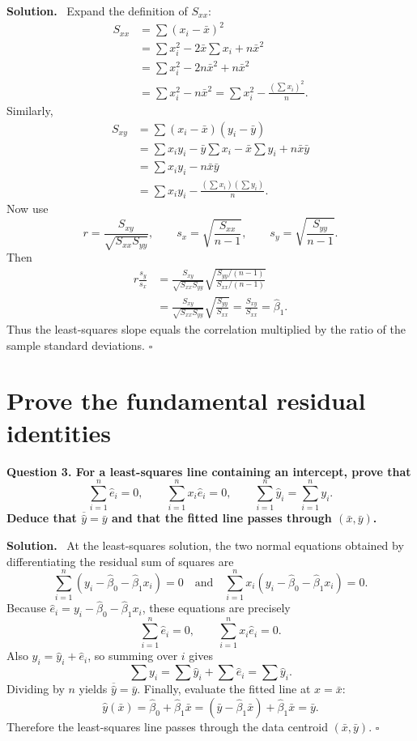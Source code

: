 \documentclass[11pt]{article}
\newcommand{\Sxx}{S_{xx}}
\newcommand{\Sxy}{S_{xy}}
\newcommand{\Syy}{S_{yy}}
\newcommand{\bzero}{\widehat{\beta}_0}
\newcommand{\bone}{\widehat{\beta}_1}
\newcommand{\yhat}{\widehat{y}}
\newcommand{\e}{\widehat{e}}
\newenvironment{question}
  {\par\medskip\noindent\color{navy}\bfseries}
  {\par\medskip\color{black}}
\newenvironment{solution}
  {\noindent\color{darkgreen}\textbf{Solution.}\color{black}\ }
  {\hfill$\square$\par\medskip}
\begin{document}
\begin{solution}
Expand the definition of $\Sxx$:
\begin{align*}
\Sxx
 &=\sum(x_i-\bar x)^2\\
 &=\sum x_i^2-2\bar x\sum x_i+n\bar x^2\\
 &=\sum x_i^2-2n\bar x^2+n\bar x^2\\
 &=\sum x_i^2-n\bar x^2
 =\sum x_i^2-\frac{(\sum x_i)^2}{n}.
\end{align*}
Similarly,
\begin{align*}
\Sxy
 &=\sum(x_i-\bar x)(y_i-\bar y)\\
 &=\sum x_iy_i-\bar y\sum x_i-\bar x\sum y_i+n\bar x\bar y\\
 &=\sum x_iy_i-n\bar x\bar y\\
 &=\sum x_iy_i-\frac{(\sum x_i)(\sum y_i)}{n}.
\end{align*}
Now use
\[
 r=\frac{\Sxy}{\sqrt{\Sxx\Syy}},
 \qquad
 s_x=\sqrt{\frac{\Sxx}{n-1}},
 \qquad
 s_y=\sqrt{\frac{\Syy}{n-1}}.
\]
Then
\begin{align*}
r\frac{s_y}{s_x}
 &=\frac{\Sxy}{\sqrt{\Sxx\Syy}}
   \sqrt{\frac{\Syy/(n-1)}{\Sxx/(n-1)}}\\
 &=\frac{\Sxy}{\sqrt{\Sxx\Syy}}
   \sqrt{\frac{\Syy}{\Sxx}}
 =\frac{\Sxy}{\Sxx}
 =\bone.
\end{align*}
Thus the least-squares slope equals the correlation multiplied by the ratio
of the sample standard deviations.
\end{solution}

\section{Prove the fundamental residual identities}

\begin{question}
Question 3. For a least-squares line containing an intercept, prove that
\[
 \boxed{\sum_{i=1}^n\e_i=0},
 \qquad
 \boxed{\sum_{i=1}^n x_i\e_i=0},
 \qquad
 \boxed{\sum_{i=1}^n\yhat_i=\sum_{i=1}^n y_i}.
\]
Deduce that $\overline{\widehat y}=\bar y$ and that the fitted line passes
through $(\bar x,\bar y)$.
\end{question}

\begin{solution}
At the least-squares solution, the two normal equations obtained by
differentiating the residual sum of squares are
\[
 \sum_{i=1}^n(y_i-\bzero-\bone x_i)=0
 \quad\text{and}\quad
 \sum_{i=1}^n x_i(y_i-\bzero-\bone x_i)=0.
\]
Because $\e_i=y_i-\bzero-\bone x_i$, these equations are precisely
\[
  \sum_{i=1}^n\e_i=0,
  \qquad
  \sum_{i=1}^n x_i\e_i=0.
\]
Also $y_i=\yhat_i+\e_i$, so summing over $i$ gives
\[
 \sum y_i=\sum\yhat_i+\sum\e_i=\sum\yhat_i.
\]
Dividing by $n$ yields $\overline{\widehat y}=\bar y$. Finally, evaluate the
fitted line at $x=\bar x$:
\[
 \widehat y(\bar x)
 =\bzero+\bone\bar x
 =(\bar y-\bone\bar x)+\bone\bar x
 =\bar y.
\]
Therefore the least-squares line passes through the data centroid
$(\bar x,\bar y)$.
\end{solution}
\end{document}
